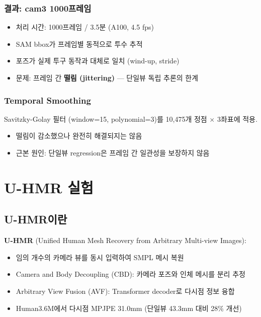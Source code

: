 \documentclass[11pt, a4paper]{report}
\begin{document}
\subsection{결과: cam3 1000프레임}

\begin{itemize}[leftmargin=*]
  \item 처리 시간: 1000프레임 / 3.5분 (A100, 4.5 fps)
  \item SAM bbox가 프레임별 동적으로 투수 추적
  \item 포즈가 실제 투구 동작과 대체로 일치 (wind-up, stride)
  \item 문제: 프레임 간 \textbf{떨림 (jittering)} --- 단일뷰 독립 추론의 한계
\end{itemize}

\subsection{Temporal Smoothing}

Savitzky-Golay 필터 (window=15, polynomial=3)를 10,475개 정점 $\times$ 3좌표에 적용.
\begin{itemize}[leftmargin=*]
  \item 떨림이 감소했으나 완전히 해결되지는 않음
  \item 근본 원인: 단일뷰 regression은 프레임 간 일관성을 보장하지 않음
\end{itemize}


\chapter{U-HMR 실험}

\section{U-HMR이란}

\textbf{U-HMR} (Unified Human Mesh Recovery from Arbitrary Multi-view Images):
\begin{itemize}[leftmargin=*]
  \item 임의 개수의 카메라 뷰를 동시 입력하여 SMPL 메시 복원
  \item Camera and Body Decoupling (CBD): 카메라 포즈와 인체 메시를 분리 추정
  \item Arbitrary View Fusion (AVF): Transformer decoder로 다시점 정보 융합
  \item Human3.6M에서 다시점 MPJPE 31.0mm (단일뷰 43.3mm 대비 28\% 개선)
\end{itemize}
\end{document}
